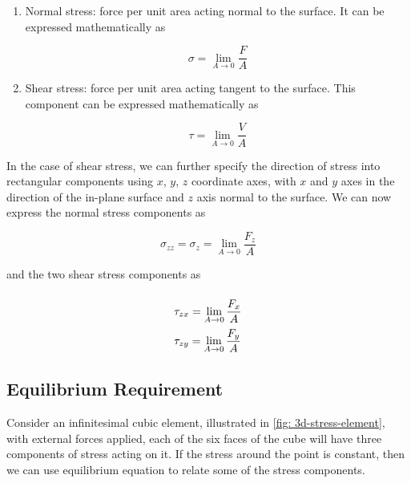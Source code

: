 \documentclass[
10pt,
a4paper,
openany,
svgnames,
]{book} %
\begin{document}
\begin{enumerate}

\item Normal stress: force per unit area acting normal to the surface. It can be expressed mathematically as

\begin{equation}
\sigma  = \mathop {\lim }\limits_{A \to 0} \frac{F}{A}
\end{equation}

\item Shear stress: force per unit area acting tangent to the surface. This component can be expressed mathematically as

  \begin{equation}
    \tau  = \mathop {\lim }\limits_{A \to 0} \frac{V}{A}
  \end{equation}
\end{enumerate}

In the case of shear stress, we can further specify the direction of stress into rectangular components using $x$, $y$, $z$ coordinate axes, with $x$ and $y$ axes in the direction of the in-plane surface and $z$ axis normal to the surface. We can now express the normal stress components as

\begin{equation}
  \sigma _{zz} = {\sigma _z} = \mathop {\lim }\limits_{A \to 0} \frac{{{F_z}}}{A}
\end{equation}

and the two shear stress components as

\begin{equation}
  \arraycolsep=1.4pt\def\arraystretch{2.2}
  \begin{array}{l}
    {\tau _{zx}} = \mathop {\lim }\limits_{A \to 0} \dfrac{F_x}{A} \\
    {\tau _{zy}} = \mathop {\lim }\limits_{A \to 0} \dfrac{F_y}{A}
  \end{array}
\end{equation}

\subsection{Equilibrium Requirement}

Consider an infinitesimal cubic element, illustrated in \cref{fig: 3d-stress-element}, with external forces applied, each of the six faces of the cube will have three components of stress acting on it. If the stress around the point is constant, then we can use equilibrium equation to relate some of the stress components.
\end{document}
